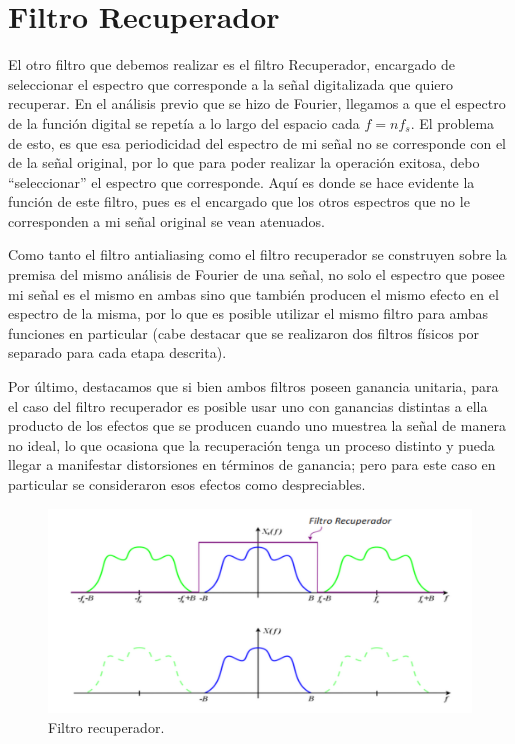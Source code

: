 \documentclass[../../ASSD_TP1_G7.tex]{subfiles}
\begin{document}
\newpage


\section{Filtro Recuperador}

El otro filtro que debemos realizar es el filtro Recuperador, encargado
de seleccionar el espectro que corresponde a la señal digitalizada
que quiero recuperar. En el análisis previo que se hizo de Fourier,
llegamos a que el espectro de la función digital se repetía a lo largo
del espacio cada $f=nf_{s}$. El problema de esto, es que esa periodicidad
del espectro de mi señal no se corresponde con el de la señal original,
por lo que para poder realizar la operación exitosa, debo ``seleccionar''
el espectro que corresponde. Aquí es donde se hace evidente la función
de este filtro, pues es el encargado que los otros espectros que no
le corresponden a mi señal original se vean atenuados. 

Como tanto el filtro antialiasing como el filtro recuperador se construyen
sobre la premisa del mismo análisis de Fourier de una señal, no solo
el espectro que posee mi señal es el mismo en ambas sino que también
producen el mismo efecto en el espectro de la misma, por lo que es
posible utilizar el mismo filtro para ambas funciones en particular
(cabe destacar que se realizaron dos filtros físicos por separado
para cada etapa descrita). 

Por último, destacamos que si bien ambos filtros poseen ganancia unitaria,
para el caso del filtro recuperador es posible usar uno con ganancias
distintas a ella producto de los efectos que se producen cuando uno
muestrea la señal de manera no ideal, lo que ocasiona que la recuperación
tenga un proceso distinto y pueda llegar a manifestar distorsiones
en términos de ganancia; pero para este caso en particular se consideraron
esos efectos como despreciables.

\begin{figure}[H]

\begin{centering}
\includegraphics[scale=0.6]{Imagenes/recuperador.PNG}\caption{Filtro recuperador.}
\par\end{centering}
\end{figure}
\end{document}
